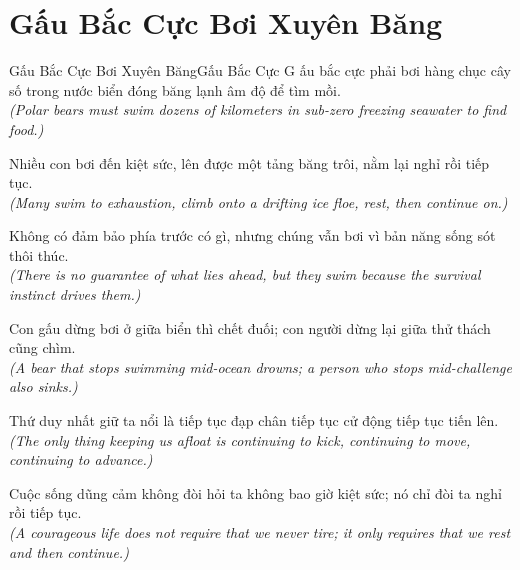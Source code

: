 \section{Gấu Bắc Cực Bơi Xuyên Băng}
\begin{truyen}{Gấu Bắc Cực Bơi Xuyên Băng}{Gấu Bắc Cực}
G ấu bắc cực phải bơi hàng chục cây số trong nước biển đóng băng lạnh âm độ để tìm mồi.\\
\textit{(Polar bears must swim dozens of kilometers in sub-zero freezing seawater to find food.)}

Nhiều con bơi đến kiệt sức, lên được một tảng băng trôi, nằm lại nghỉ rồi tiếp tục.\\
\textit{(Many swim to exhaustion, climb onto a drifting ice floe, rest, then continue on.)}

Không có đảm bảo phía trước có gì, nhưng chúng vẫn bơi vì bản năng sống sót thôi thúc.\\
\textit{(There is no guarantee of what lies ahead, but they swim because the survival instinct drives them.)}

Con gấu dừng bơi ở giữa biển thì chết đuối; con người dừng lại giữa thử thách cũng chìm.\\
\textit{(A bear that stops swimming mid-ocean drowns; a person who stops mid-challenge also sinks.)}

Thứ duy nhất giữ ta nổi là tiếp tục đạp chân tiếp tục cử động tiếp tục tiến lên.\\
\textit{(The only thing keeping us afloat is continuing to kick, continuing to move, continuing to advance.)}

\end{truyen}
\begin{baihoc}
  Cuộc sống dũng cảm không đòi hỏi ta không bao giờ kiệt sức; nó chỉ đòi ta nghỉ rồi tiếp tục.\\
  \textit{(A courageous life does not require that we never tire; it only requires that we rest and then continue.)}
\end{baihoc}

